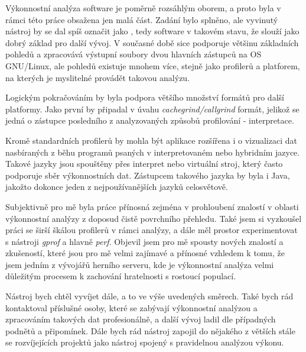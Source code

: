 \documentclass[czech,BP]{thesiskiv}
\begin{document}
Výkonnostní analýza software je poměrně rozsáhlým oborem, a proto byla v rámci této práce obsažena jen malá část. Zadání bylo splněno, ale vyvinutý nástroj by se dal spíš označit jako , tedy software v takovém stavu, že slouží jako dobrý základ pro další vývoj. V současné době sice podporuje většinu základních pohledů a zpracovává výstupní soubory dvou hlavních zástupců na OS GNU/Linux, ale pohledů existuje mnohem více, stejně jako profilerů a platforem, na kterých je myslitelné provádět takovou analýzu.

Logickým pokračováním by byla podpora většího množství formátů pro další platformy. Jako první by připadal v úvahu \emph{cachegrind/callgrind} formát, jelikož se jedná o zástupce posledního z analyzovaných způsobů profilování - interpretace.

Kromě standardních profilerů by mohla být aplikace rozšířena i o vizualizaci dat nasbíraných z běhu programů psaných v interpretovaném nebo hybridním jazyce. Takové jazyky jsou spouštěny přes interpret nebo virtuální stroj, který často podporuje sběr výkonnostních dat. Zástupcem takového jazyka by byla i Java, jakožto dokonce jeden z nejpoužívanějších jazyků celosvětově\cite{tiobe}.

Subjektivně pro mě byla práce přínosná zejména v prohloubení znalostí v oblasti výkonnostní analýzy z doposud čistě povrchního přehledu. Také jsem si vyzkoušel práci se širší škálou profilerů v rámci analýzy, a dále měl prostor experimentovat s nástroji \emph{gprof} a hlavně \emph{perf}. Objevil jsem pro mě spousty nových znalostí a zkušeností, které jsou pro mě velmi zajímavé a přínosné vzhledem k tomu, že jsem jedním z vývojářů herního serveru, kde je výkonnostní analýza velmi důležitým procesem k zachování hratelnosti s rostoucí populací.

Nástroj bych chtěl vyvíjet dále, a to ve výše uvedených směrech. Také bych rád kontaktoval příslušné osoby, které se zabývají výkonnostní analýzou a zpracováním takových dat profesionálně, a další vývoj ladil dle případných podnětů a připomínek. Dále bych rád nástroj zapojil do nějakého z větších stále se rozvíjejících projektů jako nástroj spojený s pravidelnou analýzou výkonu.




\newpage


{\raggedright\small

}






\end{document}

